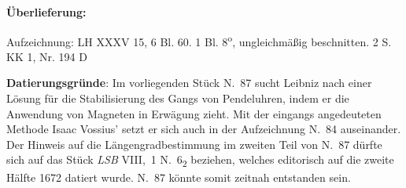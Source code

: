                   
                \begin{ledgroupsized}[r]{120mm}
                \footnotesize 
                \pstart                
                \noindent\textbf{\"{U}berlieferung:}   
                \pend
                \end{ledgroupsized}
            
              
                            
                            \begin{ledgroupsized}[r]{114mm}
                            \footnotesize 
                            \pstart \parindent -6mm
                            Aufzeichnung: LH XXXV 15, 6 Bl. 60. 1 Bl. 8\textsuperscript{o}, ungleichm\"{a}{\ss}ig beschnitten. 2 S. \\KK 1, Nr. 194 D \pend
                            \end{ledgroupsized}
                \vspace*{5mm}
                \begin{ledgroup}
                \footnotesize 
                \pstart
            \noindent\footnotesize{\textbf{Datierungsgr\"{u}nde}: Im vorliegenden Stück N.~87 %
sucht Leibniz nach einer L\"{o}sung f\"{u}r die Stabilisierung des Gangs von Pendeluhren,
indem er die Anwendung von Magneten in Erwägung zieht.
Mit der eingangs angedeuteten Methode Isaac Vossius' setzt er sich auch in der Aufzeichnung N.~84 %
auseinander.
Der Hinweis auf die L\"{a}ngengradbestimmung im zweiten Teil von N.~87 %
dürfte sich auf das St\"{u}ck \cite{01072}\textit{LSB} VIII,~1 N.~6\textsubscript{2} beziehen, 
welches editorisch auf die zweite H\"{a}lfte 1672 datiert wurde.
N.~87 %
könnte somit zeitnah entstanden sein.}
                \pend
                \end{ledgroup}
            
